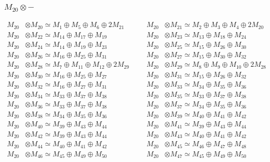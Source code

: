 \subsubsection{$ M_{20}\otimes -$}
\begin{align*}
M_{20} &\otimes M_{20} \simeq M_{1} \oplus M_{5} \oplus M_{6} \oplus 2M_{21} &&& M_{20} &\otimes M_{21} \simeq M_{2} \oplus M_{3} \oplus M_{4} \oplus 2M_{20}\\
M_{20} &\otimes M_{22} \simeq M_{14} \oplus M_{17} \oplus M_{19} &&& M_{20} &\otimes M_{23} \simeq M_{13} \oplus M_{18} \oplus M_{24}\\
M_{20} &\otimes M_{24} \simeq M_{14} \oplus M_{19} \oplus M_{23} &&& M_{20} &\otimes M_{25} \simeq M_{15} \oplus M_{26} \oplus M_{30}\\
M_{20} &\otimes M_{26} \simeq M_{16} \oplus M_{25} \oplus M_{31} &&& M_{20} &\otimes M_{27} \simeq M_{15} \oplus M_{30} \oplus M_{32}\\
M_{20} &\otimes M_{28} \simeq M_{7} \oplus M_{11} \oplus M_{12} \oplus 2M_{29} &&& M_{20} &\otimes M_{29} \simeq M_{8} \oplus M_{9} \oplus M_{10} \oplus 2M_{28}\\
M_{20} &\otimes M_{30} \simeq M_{16} \oplus M_{25} \oplus M_{27} &&& M_{20} &\otimes M_{31} \simeq M_{15} \oplus M_{26} \oplus M_{32}\\
M_{20} &\otimes M_{32} \simeq M_{16} \oplus M_{27} \oplus M_{31} &&& M_{20} &\otimes M_{33} \simeq M_{34} \oplus M_{35} \oplus M_{36}\\
M_{20} &\otimes M_{34} \simeq M_{33} \oplus M_{37} \oplus M_{38} &&& M_{20} &\otimes M_{35} \simeq M_{33} \oplus M_{37} \oplus M_{38}\\
M_{20} &\otimes M_{36} \simeq M_{33} \oplus M_{37} \oplus M_{38} &&& M_{20} &\otimes M_{37} \simeq M_{34} \oplus M_{35} \oplus M_{36}\\
M_{20} &\otimes M_{38} \simeq M_{34} \oplus M_{35} \oplus M_{36} &&& M_{20} &\otimes M_{39} \simeq M_{40} \oplus M_{41} \oplus M_{42}\\
M_{20} &\otimes M_{40} \simeq M_{39} \oplus M_{43} \oplus M_{44} &&& M_{20} &\otimes M_{41} \simeq M_{39} \oplus M_{43} \oplus M_{44}\\
M_{20} &\otimes M_{42} \simeq M_{39} \oplus M_{43} \oplus M_{44} &&& M_{20} &\otimes M_{43} \simeq M_{40} \oplus M_{41} \oplus M_{42}\\
M_{20} &\otimes M_{44} \simeq M_{40} \oplus M_{41} \oplus M_{42} &&& M_{20} &\otimes M_{45} \simeq M_{46} \oplus M_{47} \oplus M_{48}\\
M_{20} &\otimes M_{46} \simeq M_{45} \oplus M_{49} \oplus M_{50} &&& M_{20} &\otimes M_{47} \simeq M_{45} \oplus M_{49} \oplus M_{50}\\

\end{align*}
